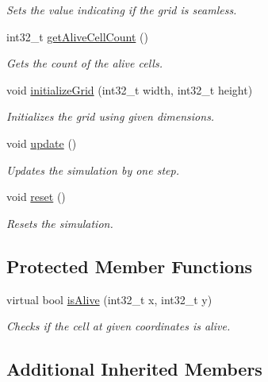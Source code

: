 \begin{DoxyCompactItemize}
\begin{DoxyCompactList}\small\item\em Sets the value indicating if the grid is seamless. \end{DoxyCompactList}\item 
int32\+\_\+t \mbox{\hyperlink{class_simulation_a73e3f1767b8503fa4d0608ec49e797bd}{get\+Alive\+Cell\+Count}} ()
\begin{DoxyCompactList}\small\item\em Gets the count of the alive cells. \end{DoxyCompactList}\item 
void \mbox{\hyperlink{class_simulation_ab07da37d80b50e6d52ae0697746f3afa}{initialize\+Grid}} (int32\+\_\+t width, int32\+\_\+t height)
\begin{DoxyCompactList}\small\item\em Initializes the grid using given dimensions. \end{DoxyCompactList}\item 
void \mbox{\hyperlink{class_simulation_a05f768b6836615170f1c43c6c0787fe8}{update}} ()
\begin{DoxyCompactList}\small\item\em Updates the simulation by one step. \end{DoxyCompactList}\item 
void \mbox{\hyperlink{class_simulation_a2dc2464162d59383e0a1c68a3f9c42fb}{reset}} ()
\begin{DoxyCompactList}\small\item\em Resets the simulation. \end{DoxyCompactList}\end{DoxyCompactItemize}
\subsection*{Protected Member Functions}
\begin{DoxyCompactItemize}
\item 
virtual bool \mbox{\hyperlink{class_simulation_abcacd825d905eb8ff9b2cad4fdf76bdd}{is\+Alive}} (int32\+\_\+t x, int32\+\_\+t y)
\begin{DoxyCompactList}\small\item\em Checks if the cell at given coordinates is alive. \end{DoxyCompactList}\end{DoxyCompactItemize}
\subsection*{Additional Inherited Members}



